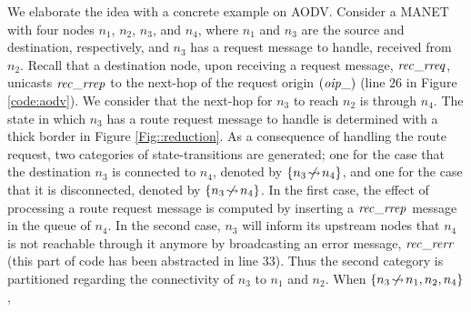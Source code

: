
We elaborate the idea with a concrete example on AODV. Consider a MANET with four nodes $n_1$, $n_2$, $n_3$, and $n_4$, where $n_1$ and $n_3$ are the source and destination, respectively, and $n_3$ has a request message to handle, received from $n_2$.
Recall that a destination node, upon receiving a request message, ${\it rec\_rreq}$, unicasts ${\it rec\_rrep}$ to the next-hop of the request origin  
$({\it oip\_})$ (line $26$ in Figure \ref{code:aodv}). We consider that the next-hop for $n_3$ to reach $n_2$ is through $n_4$. The state in which $n_3$ has a route request message to handle is determined with a thick border in Figure \ref{Fig::reduction}. As a consequence of handling the route request, two categories of state-transitions are generated; one for the case that the destination $n_3$ is connected to $n_4$, denoted by $\{n_3\!\mathrel{\hspace{.1em}\not\hspace{-.1em}\rightsquigarrow}\! n_4\}$, and one for the case that it is disconnected, denoted by $\{n_3\!\mathrel{\hspace{.1em}\not\hspace{-.1em}\rightsquigarrow}\! n_4\}$. In the first case, %
the effect of processing a route request message is computed by inserting a ${\it rec\_rrep}$ message in the queue of $n_4$. In the second case, $n_3$ will inform its upstream nodes that $n_4$ is not reachable through it anymore by broadcasting an error message, ${\it rec\_rerr}$ (this part of code has been abstracted in line $33$). %
Thus the second category is partitioned regarding the connectivity of $n_3$ to $n_1$ and $n_2$. When $\{n_3\!\mathrel{\hspace{.1em}\not\hspace{-.1em}\rightsquigarrow}\! n_1,n_2,n_4\}$, %
